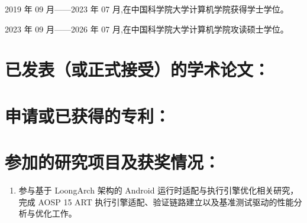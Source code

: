 2019 年 09 月——2023 年 07 月,在中国科学院大学计算机学院获得学士学位。

2023 年 09 月——2026 年 07 月,在中国科学院大学计算机学院攻读硕士学位。

\section*{已发表（或正式接受）的学术论文：}

\section*{申请或已获得的专利：}

\section*{参加的研究项目及获奖情况：}

{
\setlist[enumerate]{}%
\begin{enumerate}[nosep]
    \item 参与基于 LoongArch 架构的 Android 运行时适配与执行引擎优化相关研究，完成 AOSP 15 ART
    执行引擎适配、验证链路建立以及基准测试驱动的性能分析与优化工作。
\end{enumerate}
}

\cleardoublepage[plain]%
